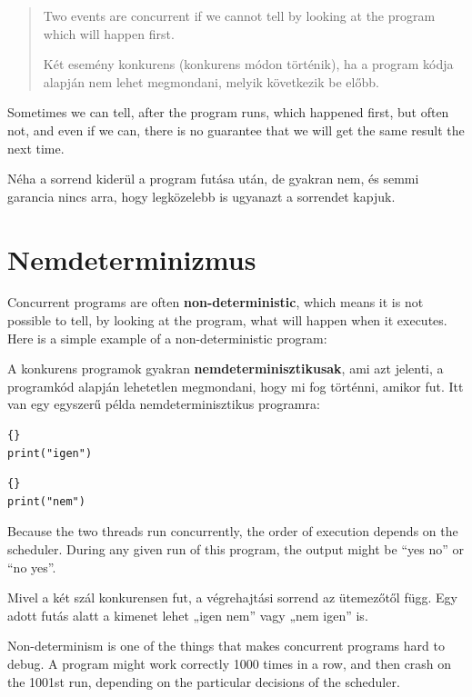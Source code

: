 \documentclass{book}
\begin{document}
\begin{quote}
Two events are concurrent if we cannot tell by looking at
the program which will happen first.

Két esemény konkurens (konkurens módon történik), ha
a program kódja alapján nem lehet megmondani, melyik
következik be előbb.
\end{quote}

Sometimes we can tell, after the program runs, which happened first,
but often not, and even if we can, there is no guarantee that we will
get the same result the next time.

Néha a sorrend kiderül a program futása után, de gyakran nem, és
semmi garancia nincs arra, hogy legközelebb is ugyanazt a sorrendet kapjuk.

\newpage
\section{Nemdeterminizmus}

Concurrent programs are often {\bf non-deterministic}, which means it
is not possible to tell, by looking at the program, what will happen
when it executes.  Here is a simple example of a
non-deterministic program:

A konkurens programok gyakran {\bf nemdeterminisztikusak}, ami azt
jelenti, a programkód alapján lehetetlen megmondani, hogy mi fog
történni, amikor fut. Itt van egy egyszerű példa nemdeterminisztikus
programra:
 
\begin{minipage}[t]{2in}
\begin{lstlisting}[title={„A” szál}]{}
print("igen")
\end{lstlisting}
\end{minipage}
\hfill
\begin{minipage}[t]{2in}
\begin{lstlisting}[title={„B” szál}]{}
print("nem")
\end{lstlisting}
\end{minipage}

Because the two threads run concurrently, the order of
execution depends on the scheduler.  During any given run
of this program, the output might be ``yes no'' or ``no yes''.

Mivel a két szál konkurensen fut, a végrehajtási sorrend
az ütemezőtől függ. Egy adott futás alatt a kimenet lehet
„igen nem” vagy „nem igen” is.
 
Non-determinism is one of the things that makes concurrent
programs hard to debug.  A program might work correctly
1000 times in a row, and then crash on the 1001st run, depending
on the particular decisions of the scheduler.
\end{document}
